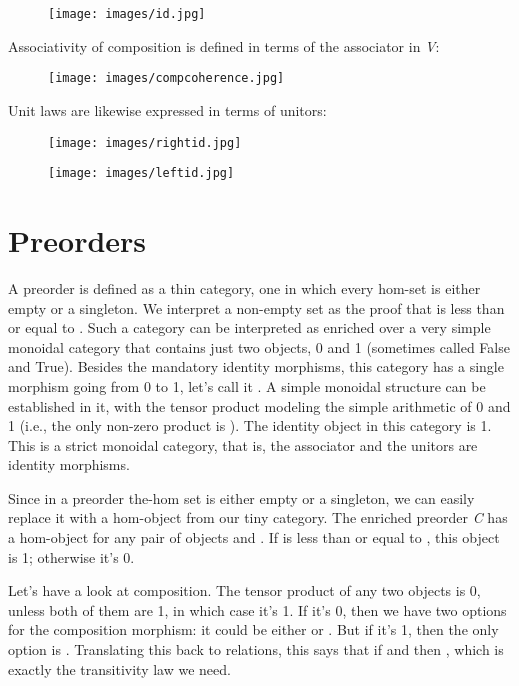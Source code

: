 \begin{figure}[H]
\centering
\texttt{[image: images/id.jpg]}
\end{figure}

\noindent
Associativity of composition is defined in terms of the associator in
\emph{V}:

\begin{figure}[H]
\centering
\texttt{[image: images/compcoherence.jpg]}
\end{figure}

\noindent
Unit laws are likewise expressed in terms of unitors:

\begin{figure}[H]
\centering
\texttt{[image: images/rightid.jpg]}
\end{figure}

\begin{figure}[H]
\centering
\texttt{[image: images/leftid.jpg]}
\end{figure}

\section{Preorders}\label{preorders}

A preorder is defined as a thin category, one in which every hom-set is
either empty or a singleton. We interpret a non-empty set
 as the proof that  is less than or equal to
. Such a category can be interpreted as enriched over a very
simple monoidal category that contains just two objects, 0 and 1
(sometimes called False and True). Besides the mandatory identity
morphisms, this category has a single morphism going from 0 to 1, let's
call it . A simple monoidal structure can be
established in it, with the tensor product modeling the simple
arithmetic of 0 and 1 (i.e., the only non-zero product is ).
The identity object in this category is 1. This is a strict monoidal
category, that is, the associator and the unitors are identity
morphisms.

Since in a preorder the-hom set is either empty or a singleton, we can
easily replace it with a hom-object from our tiny category. The enriched
preorder \emph{C} has a hom-object  for any pair of
objects  and . If  is less than or equal
to , this object is 1; otherwise it's 0.

Let's have a look at composition. The tensor product of any two objects
is 0, unless both of them are 1, in which case it's 1. If it's 0, then
we have two options for the composition morphism: it could be either
 or . But if it's 1, then the only
option is . Translating this back to relations, this says
that if  and  then
, which is exactly the transitivity law we
need.


